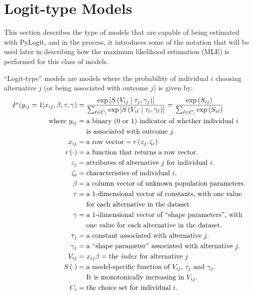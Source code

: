 \documentclass{article}
\begin{document}
\section{Logit-type Models}
This section describes the type of models that are capable of being estimated with PyLogit, and in the process, it introduces some of the notation that will be used later in describing how the maximum likelihood estimation (MLE) is performed for this class of models.

``Logit-type'' models are models where the probability of individual $i$ choosing alternative $j$ (or being associated with outcome $j$) is given by:
\begin{equation}
\label{eqn:logit_type}
\begin{aligned}
P \left( y_{ij} = 1 | x_{ij}, \beta, \tau, \gamma \right) &= \frac{\exp \left[ S \left( V_{ij} \mid \tau _j, \gamma _j \right) \right]}{ \sum _{\ell \in C_i} \exp \left[ S \left( V_{i \ell} \mid \tau _{\ell}, \gamma _{\ell} \right) \right]}  = \frac{\exp \left( S_{ij} \right)}{ \sum _{\ell \in C_i} \exp \left( S_{i \ell} \right)}\\
\textrm{where } y_{ij} &= \textrm{a binary (0 or 1) indicator of whether individual $i$} \\
&\quad \  \textrm{is associated with outcome $j$.} \\
x_{ij} &= \textrm{a row vector} = r \left( z_j, \zeta _i \right)  \\
r \left( \cdot  \right) &= \textrm{a function that returns a row vector.} \\
z _j &= \textrm{attributes of alternative $j$ for individual $i$.} \\
\zeta _i &= \textrm{characteristics of individual $i$.} \\
\beta &= \textrm{a column vector of unknown population parameters.} \\
\tau &= \textrm{a 1-dimensional vector of constants, with one value}\\
&\quad \ \textrm{for each alternative in the dataset.}\\
\gamma &= \textrm{a 1-dimensional vector of ``shape parameters'', with}\\
&\quad \ \textrm{one value for each alternative in the dataset.}\\
\tau _j &= \textrm{a constant associated with alternative $j$.}\\
\gamma _j &= \textrm{a ``shape parameter'' associated with alternative $j$.} \\
V_{ij} &= x_{ij} \beta = \textrm{the \textit{index} for alternative $j$}\\
S \left( \cdot \right) &= \textrm{a model-specific function of $V_{ij}$, $\tau_j$ and $\gamma_j$.} \\
&\quad \ \textrm{It is monotonically increasing in $V_{ij}$.}\\
C_i &= \textrm{the choice set for individual $i$.}
\end{aligned}
\end{equation}
\end{document}
